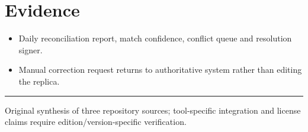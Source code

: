 \documentclass[10pt,letterpaper]{article}
\begin{document}
\section{Evidence}
\begin{itemize}
\item Daily reconciliation report, match confidence, conflict queue and resolution signer.
\item Manual correction request returns to authoritative system rather than editing the replica.
\end{itemize}
\vfill\noindent\color{muted}\rule{\linewidth}{0.4pt}\par\scriptsize Original synthesis of three repository sources; tool-specific integration and license claims require edition/version-specific verification.\normalsize
\end{document}
